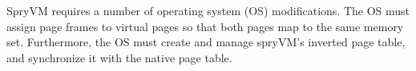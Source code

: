 \begin{comment}
Page Cache                        & \begin{tabular}[c]{@{}l@{}}Having different allocation policies in the page cache complicates the design and adds overhead.\\ Alternatively, we could use one policy for all pages: virtual \& physical pages map to the same set. \end{tabular}                  \\ \hline
\multirow{2}{*}{Synonyms}         & \multirow{2}{*}{\begin{tabular}[c]{@{}l@{}} Communication between processes through shared memory employs the page cache layer, and hence\\ the overheads would be similar to the previous case: an increase in code complexity in the page cache.\\ \end{tabular}} \\
                                  &                                                                                                                                                                                                                                                      \\ \hline
\end{tabular}
\end{table*}
  
\end{comment}
SpryVM requires a number of operating system (OS) modifications. The OS must assign page frames to virtual pages so that both pages map to the same memory set. Furthermore, the OS must create and manage spryVM's inverted page table, and synchronize it with the native page table. 

